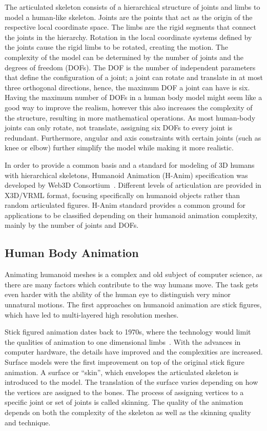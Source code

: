 The articulated skeleton consists of a hierarchical structure of joints and limbs to model a human-like skeleton. Joints are the points that act as the origin of the respective local coordinate space. The limbs are the rigid segments that connect the joints in the hierarchy. Rotation in the local coordinate systems defined by the joints cause the rigid limbs to be rotated, creating the motion. The complexity of the model can be determined by the number of joints and the degrees of freedom (DOFs). The DOF is the number of independent parameters that define the configuration of a joint; a joint can rotate and translate in at most three orthogonal directions, hence, the maximum DOF a joint can have is six. Having the maximum number of DOFs in a human body model might seem like a good way to improve the realism, however this also increases the complexity of the structure, resulting in more mathematical operations. As most human-body joints can only rotate, not translate, assigning six DOFs to every joint is redundant. Furthermore, angular and axis constraints with certain joints (such as knee or elbow) further simplify the model while making it more realistic. 

In order to provide a common basis and a standard for modeling of 3D humans with hierarchical skeletons, Humanoid Animation (H-Anim) specification was developed by Web3D Consortium~\cite{HANIM}. Different levels of articulation are provided in X3D/VRML format, focusing specifically on humanoid objects rather than random articulated figures. H-Anim standard provides a common ground for applications to be classified depending on their humanoid animation complexity, mainly by the number of joints and DOFs. 

\subsection{Human Body Animation}
\label{section_related_human_body_animation}

Animating humanoid meshes is a complex and old subject of computer science, as there are many factors which contribute to the way humans move. The task gets even harder with the ability of the human eye to distinguish very minor unnatural motions. The first approaches on humanoid animation are stick figures, which have led to multi-layered high resolution meshes. 

Stick figured animation dates back to 1970s, where the technology would limit the qualities of animation to one dimensional limbs~\cite{Badler1979}. With the advances in computer hardware, the details have improved and the complexities are increased. Surface models were the first improvement on top of the original stick figure animation. A surface or ``skin'', which envelopes the articulated skeleton is introduced to the model. The translation of the surface varies depending on how the vertices are assigned to the bones. The process of assigning vertices to a specific joint or set of joints is called skinning. The quality of the animation depends on both the complexity of the skeleton as well as the skinning quality and technique. 

